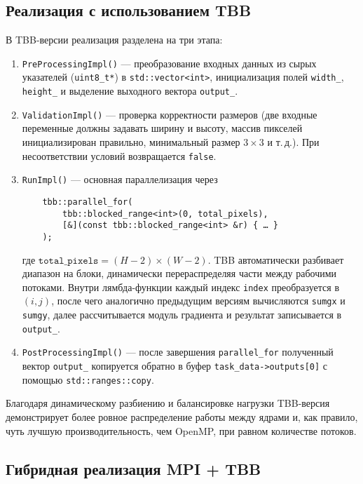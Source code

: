 \documentclass[12pt]{article}
\begin{document}
\subsection{Реализация с использованием TBB}

В TBB-версии реализация разделена на три этапа:
\begin{enumerate}
    \item \texttt{PreProcessingImpl()} — преобразование входных данных из сырых указателей (\texttt{uint8\_t*}) в \texttt{std::vector<int>}, инициализация полей \texttt{width\_}, \texttt{height\_} и выделение выходного вектора \texttt{output\_}.
    \item \texttt{ValidationImpl()} — проверка корректности размеров (две входные переменные должны задавать ширину и высоту, массив пикселей инициализирован правильно, минимальный размер $3 \times 3$ и т.\,д.). При несоответствии условий возвращается \texttt{false}.
    \item \texttt{RunImpl()} — основная параллелизация через
    \begin{verbatim}
    tbb::parallel_for(
        tbb::blocked_range<int>(0, total_pixels),
        [&](const tbb::blocked_range<int> &r) { … }
    );
    \end{verbatim}
    где \(\texttt{total\_pixels} = (H-2)\times(W-2)\). TBB автоматически разбивает диапазон на блоки, динамически перераспределяя части между рабочими потоками. Внутри лямбда-функции каждый индекс \texttt{index} преобразуется в $(i,j)$, после чего аналогично предыдущим версиям вычисляются \texttt{sumgx} и \texttt{sumgy}, далее рассчитывается модуль градиента и результат записывается в \texttt{output\_}. 
    \item \texttt{PostProcessingImpl()} — после завершения \texttt{parallel_for} полученный вектор \texttt{output\_} копируется обратно в буфер \texttt{task\_data->outputs[0]} с помощью \texttt{std::ranges::copy}.
\end{enumerate}
Благодаря динамическому разбиению и балансировке нагрузки TBB-версия демонстрирует более ровное распределение работы между ядрами и, как правило, чуть лучшую производительность, чем OpenMP, при равном количестве потоков.

\subsection{Гибридная реализация MPI + TBB}
\end{document}
